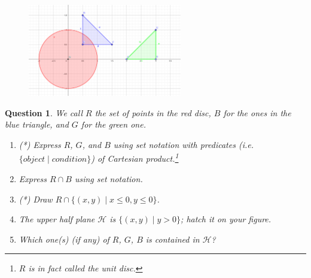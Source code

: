 \documentclass[]{article}
\newtheorem{question}{Question}
\begin{document}
\begin{figure}[h!]
	\centering
	\includegraphics[width=0.6\textwidth]{2-sets.png}
\end{figure}
\begin{question}
	We call $R$ the set of points in the red disc, $B$ for the ones in the blue triangle, and $G$ for the green one.
	\begin{enumerate}[label=\alph*.]
		\item (*) Express $R$, $G$, and $B$ using set notation with predicates (i.e. $\{ object \mid condition \}$) of Cartesian product.\footnote{$R$ is in fact called the unit disc.}
		\item Express $R \cap B$ using set notation.
		\item (*) Draw $R \cap \{ (x,y) \mid x \leq 0, y \leq 0 \}$.
		\item The upper half plane $\mathcal{H}$ is $\{ (x,y) \mid y>0 \}$; hatch it on your figure.
		\item Which one(s) (if any) of $R$, $G$, $B$ is contained in $\mathcal{H}$?
	\end{enumerate}
\end{question}
\end{document}
